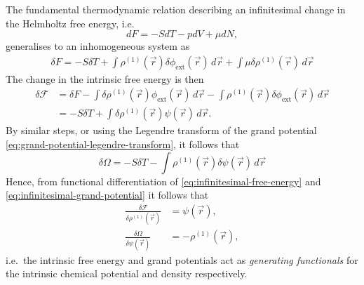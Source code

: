 The fundamental thermodynamic relation describing an infinitesimal change in the Helmholtz free energy, i.e.\
\begin{equation*}
  dF = -S dT - p dV + \mu dN,
\end{equation*}
generalises to an inhomogeneous system as
\begin{equation*}
  \begin{split}
    \delta F
    =
    - S \delta T
    + \int \rho^{(1)}(\vec{r}) \delta \phi_\mathrm{ext}(\vec{r}) \, d\vec{r}
    + \int \mu \delta \rho^{(1)}(\vec{r}) \, d\vec{r}
  \end{split}
\end{equation*}
The change in the intrinsic free energy is then
\begin{equation}\label{eq:infinitesimal-free-energy}
  \begin{split}
    \delta \mathcal{F}
    &=
    \delta F
    - \int \delta \rho^{(1)}(\vec{r}) \phi_\mathrm{ext}(\vec{r}) \, d\vec{r}
    - \int \rho^{(1)}(\vec{r}) \delta \phi_\mathrm{ext}(\vec{r}) \, d\vec{r}
    \\ &=
    - S \delta T
    + \int \delta \rho^{(1)}(\vec{r}) \psi(\vec{r}) \, d\vec{r}.
  \end{split}
\end{equation}
By similar steps, or using the Legendre transform of the grand potential \eqref{eq:grand-potential-legendre-transform}, it follows that
\begin{equation}\label{eq:infinitesimal-grand-potential}
  \delta \Omega
  =
  - S \delta T
  - \int \rho^{(1)}(\vec{r}) \delta \psi(\vec{r}) \, d\vec{r}
\end{equation}
Hence, from functional differentiation of \eqref{eq:infinitesimal-free-energy} and \eqref{eq:infinitesimal-grand-potential} it follows that
\begin{align}
  \label{eq:psi-generator}
  \frac{\delta \mathcal{F}}{\delta \rho^{(1)}(\vec{r})}
  &=
  \psi(\vec{r}),
  \\
  \label{eq:rho-generator}
  \frac{\delta \Omega}{\delta \psi(\vec{r})}
  &=
  - \rho^{(1)}(\vec{r}),
\end{align}
i.e.\ the intrinsic free energy and grand potentials act as \emph{generating functionals} for the intrinsic chemical potential and density respectively.

